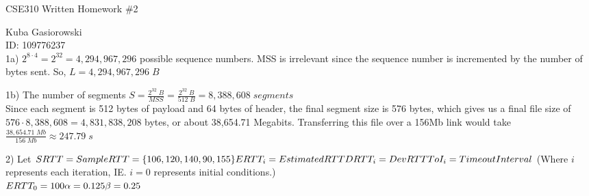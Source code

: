 \documentclass[12pt]{report}
\begin{document}
\Large
\centering
CSE310 Written Homework \#2

\justify
\normalsize

Kuba Gasiorowski\\
ID: 109776237\\

\noindent{}1a) $2^{8\cdot4} = 2^{32} = 4,294,967,296$ possible sequence numbers. MSS is irrelevant since the sequence number is incremented by the number of bytes sent. So, $\boxed{L = 4,294,967,296\;B}$

\bigskip

\noindent{}1b) The number of segments $S = \frac{2^{32}\;B}{MSS} = \frac{2^{32}\;B}{512\;B} = 8,388,608\;segments$\\
Since each segment is 512 bytes of payload and 64 bytes of header, the final segment size is 576 bytes, which gives us a final file size of $576 \cdot 8,388,608 = 4,831,838,208$ bytes, or about 38,654.71 Megabits. Transferring this file over a 156Mb link would take $\frac{38,654.71\;Mb}{156\;Mb} \approx \boxed{247.79\;s}$

\hrulefill
\bigskip

\noindent{}2)
Let $SRTT = SampleRTT = \{106, 120, 140, 90, 155\}\\\\
ERTT_i = EstimatedRTT\\
DRTT_i = DevRTT\\
ToI_i = TimeoutInterval\\
$
(Where $i$ represents each iteration, IE. $i=0$ represents initial conditions.)\\

\noindent$ERTT_0 = 100\\
\alpha = 0.125\\
\beta = 0.25\\$
\end{document}

